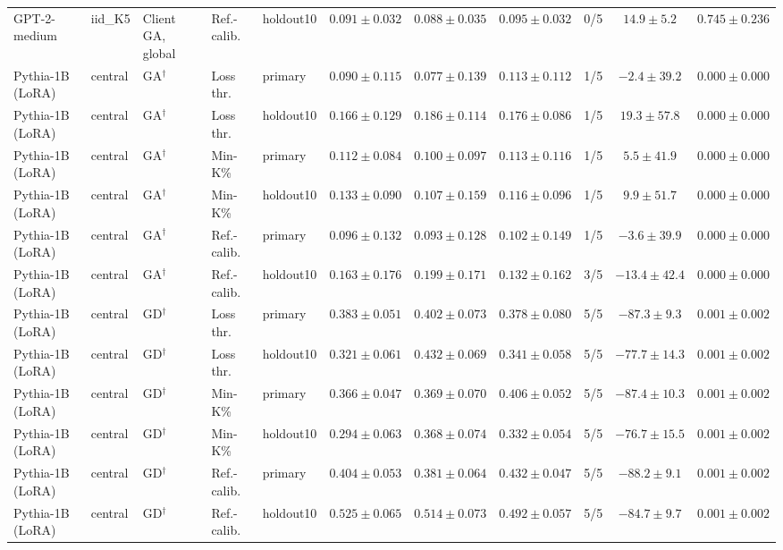 {\begin{longtable}{@{\extracolsep{\fill}}lllllcccccc@{}}
GPT-2-medium & iid\_K5 & Client GA, global & Ref.-calib. & holdout10 & $0.091 \pm 0.032$ & $0.088 \pm 0.035$ & $0.095 \pm 0.032$ & 0/5 & $14.9 \pm 5.2$ & $0.745 \pm 0.236$ \\
Pythia-1B (LoRA) & central & GA$^{\dagger}$ & Loss thr. & primary & $0.090 \pm 0.115$ & $0.077 \pm 0.139$ & $0.113 \pm 0.112$ & 1/5 & $-2.4 \pm 39.2$ & $0.000 \pm 0.000$ \\
Pythia-1B (LoRA) & central & GA$^{\dagger}$ & Loss thr. & holdout10 & $0.166 \pm 0.129$ & $0.186 \pm 0.114$ & $0.176 \pm 0.086$ & 1/5 & $19.3 \pm 57.8$ & $0.000 \pm 0.000$ \\
Pythia-1B (LoRA) & central & GA$^{\dagger}$ & Min-K\% & primary & $0.112 \pm 0.084$ & $0.100 \pm 0.097$ & $0.113 \pm 0.116$ & 1/5 & $5.5 \pm 41.9$ & $0.000 \pm 0.000$ \\
Pythia-1B (LoRA) & central & GA$^{\dagger}$ & Min-K\% & holdout10 & $0.133 \pm 0.090$ & $0.107 \pm 0.159$ & $0.116 \pm 0.096$ & 1/5 & $9.9 \pm 51.7$ & $0.000 \pm 0.000$ \\
Pythia-1B (LoRA) & central & GA$^{\dagger}$ & Ref.-calib. & primary & $0.096 \pm 0.132$ & $0.093 \pm 0.128$ & $0.102 \pm 0.149$ & 1/5 & $-3.6 \pm 39.9$ & $0.000 \pm 0.000$ \\
Pythia-1B (LoRA) & central & GA$^{\dagger}$ & Ref.-calib. & holdout10 & $0.163 \pm 0.176$ & $0.199 \pm 0.171$ & $0.132 \pm 0.162$ & 3/5 & $-13.4 \pm 42.4$ & $0.000 \pm 0.000$ \\
Pythia-1B (LoRA) & central & GD$^{\dagger}$ & Loss thr. & primary & $0.383 \pm 0.051$ & $0.402 \pm 0.073$ & $0.378 \pm 0.080$ & 5/5 & $-87.3 \pm 9.3$ & $0.001 \pm 0.002$ \\
Pythia-1B (LoRA) & central & GD$^{\dagger}$ & Loss thr. & holdout10 & $0.321 \pm 0.061$ & $0.432 \pm 0.069$ & $0.341 \pm 0.058$ & 5/5 & $-77.7 \pm 14.3$ & $0.001 \pm 0.002$ \\
Pythia-1B (LoRA) & central & GD$^{\dagger}$ & Min-K\% & primary & $0.366 \pm 0.047$ & $0.369 \pm 0.070$ & $0.406 \pm 0.052$ & 5/5 & $-87.4 \pm 10.3$ & $0.001 \pm 0.002$ \\
Pythia-1B (LoRA) & central & GD$^{\dagger}$ & Min-K\% & holdout10 & $0.294 \pm 0.063$ & $0.368 \pm 0.074$ & $0.332 \pm 0.054$ & 5/5 & $-76.7 \pm 15.5$ & $0.001 \pm 0.002$ \\
Pythia-1B (LoRA) & central & GD$^{\dagger}$ & Ref.-calib. & primary & $0.404 \pm 0.053$ & $0.381 \pm 0.064$ & $0.432 \pm 0.047$ & 5/5 & $-88.2 \pm 9.1$ & $0.001 \pm 0.002$ \\
Pythia-1B (LoRA) & central & GD$^{\dagger}$ & Ref.-calib. & holdout10 & $0.525 \pm 0.065$ & $0.514 \pm 0.073$ & $0.492 \pm 0.057$ & 5/5 & $-84.7 \pm 9.7$ & $0.001 \pm 0.002$ \\

\end{longtable}}
